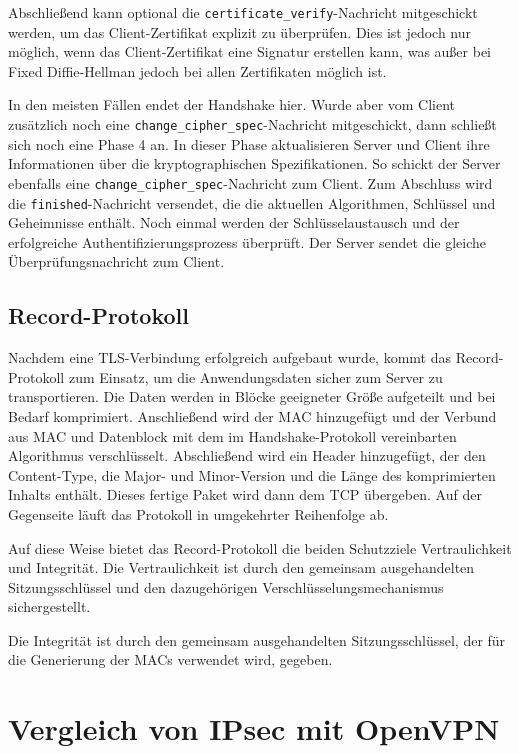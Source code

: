 \documentclass[12pt]{scrartcl}
\begin{document}
Abschließend kann optional die \texttt{certificate\_verify}-Nachricht mitgeschickt werden, um das Client-Zertifikat explizit zu überprüfen. Dies ist jedoch nur möglich, wenn das Client-Zertifikat eine Signatur erstellen kann, was außer bei Fixed Diffie-Hellman jedoch bei allen Zertifikaten möglich ist.

In den meisten Fällen endet der Handshake hier. Wurde aber vom Client zusätzlich noch eine \texttt{change\_cipher\_spec}-Nachricht mitgeschickt, dann schließt sich noch eine Phase 4 an. In dieser Phase aktualisieren Server und Client ihre Informationen über die kryptographischen Spezifikationen. So schickt der Server ebenfalls eine \texttt{change\_cipher\_spec}-Nachricht zum Client. Zum Abschluss wird die \texttt{finished}-Nachricht versendet, die die aktuellen Algorithmen, Schlüssel und Geheimnisse enthält. Noch einmal werden der Schlüsselaustausch und der erfolgreiche Authentifizierungsprozess überprüft. Der Server sendet die gleiche Überprüfungsnachricht zum Client.

\subsection{Record-Protokoll}

Nachdem eine TLS-Verbindung erfolgreich aufgebaut wurde, kommt das Record-Protokoll zum Einsatz, um die Anwendungsdaten sicher zum Server zu transportieren. Die Daten werden in Blöcke geeigneter Größe aufgeteilt und bei Bedarf komprimiert. Anschließend wird der MAC hinzugefügt und der Verbund aus MAC und Datenblock mit dem im Handshake-Protokoll vereinbarten Algorithmus verschlüsselt. Abschließend wird ein Header hinzugefügt, der den Content-Type, die Major- und Minor-Version und die Länge des komprimierten Inhalts enthält. Dieses fertige Paket wird dann dem TCP übergeben. Auf der Gegenseite läuft das Protokoll in umgekehrter Reihenfolge ab.

Auf diese Weise bietet das Record-Protokoll die beiden Schutzziele Vertraulichkeit und Integrität. Die Vertraulichkeit ist durch den gemeinsam ausgehandelten Sitzungsschlüssel und den dazugehörigen Verschlüsselungsmechanismus sichergestellt.

Die Integrität ist durch den gemeinsam ausgehandelten Sitzungsschlüssel, der für die Generierung der MACs verwendet wird, gegeben.

\section{Vergleich von IPsec mit OpenVPN}
\end{document}
